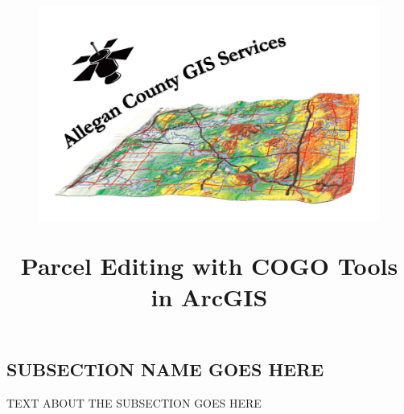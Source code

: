 \documentclass[class=book , crop=false]{standalone}
\title{ %
\HRule %
\\[.4cm] %
\begin{figure}[H] %
\begin{center}	%
\includegraphics[scale=.45]{../../../../source/GIS_Logo_better.jpg}
\end{center}
\end{figure}
\Huge \bfseries Parcel Editing with COGO Tools in ArcGIS %
\HRule \\[.4cm] %
}  %
\begin{document}

\ifstandalone
\maketitle %
\tableofcontents %
\clearpage
\fi

\subsection{SUBSECTION NAME GOES HERE}
TEXT ABOUT THE SUBSECTION GOES HERE

%
%
%
%
\end{document}
